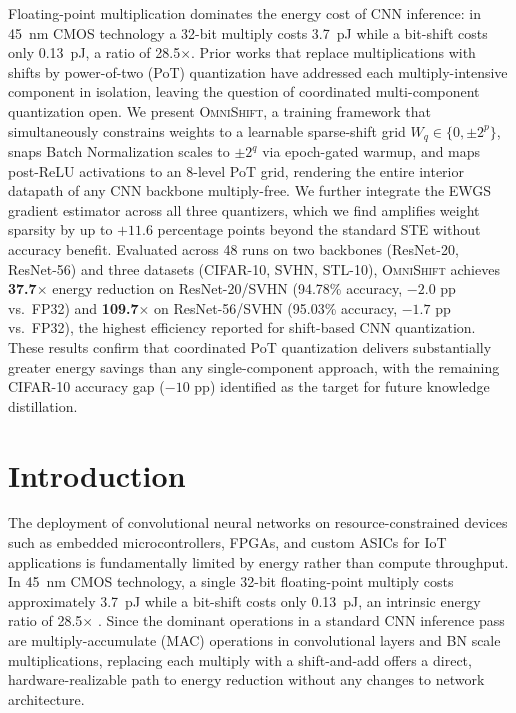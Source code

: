 \documentclass[12pt]{article}
\newcommand{\omnishift}{\textsc{OmniShift}}
\begin{document}
Floating-point multiplication dominates the energy cost of CNN inference: in 45~nm CMOS technology a 32-bit multiply costs 3.7~pJ while a bit-shift costs only 0.13~pJ, a ratio of 28.5$\times$. Prior works that replace multiplications with shifts by power-of-two (PoT) quantization have addressed each multiply-intensive component in isolation, leaving the question of coordinated multi-component quantization open. We present \omnishift{}, a training framework that simultaneously constrains weights to a learnable sparse-shift grid $W_q \in \{0, \pm 2^p\}$, snaps Batch Normalization scales to $\pm 2^q$ via epoch-gated warmup, and maps post-ReLU activations to an 8-level PoT grid, rendering the entire interior datapath of any CNN backbone multiply-free. We further integrate the EWGS gradient estimator across all three quantizers, which we find amplifies weight sparsity by up to $+11.6$ percentage points beyond the standard STE without accuracy benefit. Evaluated across 48 runs on two backbones (ResNet-20, ResNet-56) and three datasets (CIFAR-10, SVHN, STL-10), \omnishift{} achieves \textbf{37.7$\times$} energy reduction on ResNet-20/SVHN (94.78\% accuracy, $-2.0$ pp vs.\ FP32) and \textbf{109.7$\times$} on ResNet-56/SVHN (95.03\% accuracy, $-1.7$ pp vs.\ FP32), the highest efficiency reported for shift-based CNN quantization. These results confirm that coordinated PoT quantization delivers substantially greater energy savings than any single-component approach, with the remaining CIFAR-10 accuracy gap ($-10$ pp) identified as the target for future knowledge distillation.

\section{Introduction}

The deployment of convolutional neural networks on resource-constrained devices such as embedded microcontrollers, FPGAs, and custom ASICs for IoT applications is fundamentally limited by energy rather than compute throughput. In 45~nm CMOS technology, a single 32-bit floating-point multiply costs approximately 3.7~pJ while a bit-shift costs only 0.13~pJ, an intrinsic energy ratio of 28.5$\times$ \cite{chen2020adder}. Since the dominant operations in a standard CNN inference pass are multiply-accumulate (MAC) operations in convolutional layers and BN scale multiplications, replacing each multiply with a shift-and-add offers a direct, hardware-realizable path to energy reduction without any changes to network architecture.
\end{document}
